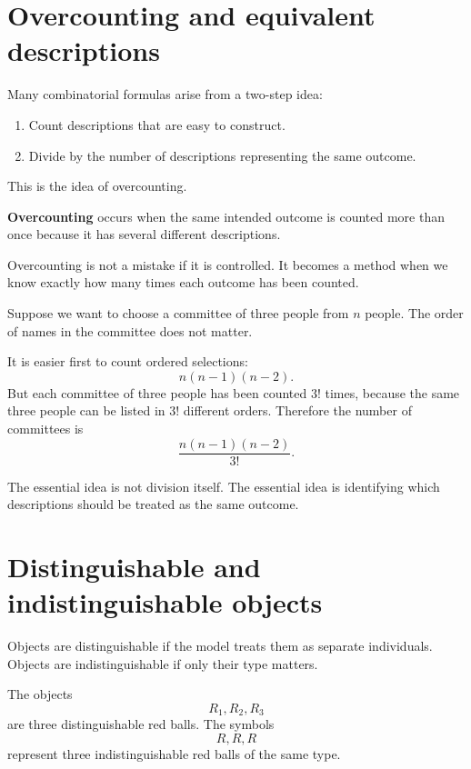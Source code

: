 \section{Overcounting and equivalent descriptions}

Many combinatorial formulas arise from a two-step idea:
\begin{enumerate}
    \item Count descriptions that are easy to construct.
    \item Divide by the number of descriptions representing the same outcome.
\end{enumerate}

This is the idea of overcounting.

\begin{definitionbox}
\textbf{Overcounting} occurs when the same intended outcome is counted more than once because it has several different descriptions.
\end{definitionbox}

Overcounting is not a mistake if it is controlled. It becomes a method when we know exactly how many times each outcome has been counted.

\begin{examplebox}
Suppose we want to choose a committee of three people from \(n\) people. The order of names in the committee does not matter.

It is easier first to count ordered selections:
\[
n(n-1)(n-2).
\]
But each committee of three people has been counted \(3!\) times, because the same three people can be listed in \(3!\) different orders. Therefore the number of committees is
\[
\frac{n(n-1)(n-2)}{3!}.
\]
\end{examplebox}

The essential idea is not division itself. The essential idea is identifying which descriptions should be treated as the same outcome.

\section{Distinguishable and indistinguishable objects}

Objects are distinguishable if the model treats them as separate individuals. Objects are indistinguishable if only their type matters.

\begin{examplebox}
The objects
\[
R_1,R_2,R_3
\]
are three distinguishable red balls. The symbols
\[
R,R,R
\]
represent three indistinguishable red balls of the same type.
\end{examplebox}

